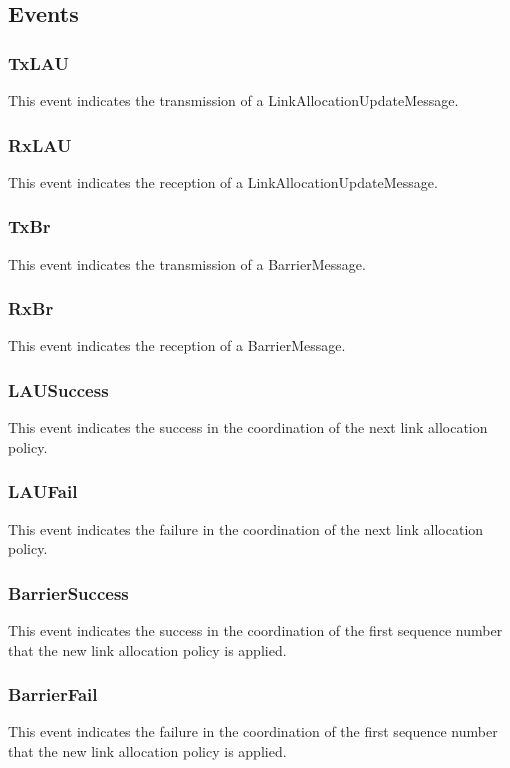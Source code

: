 \subsection{Events}

\subsubsection{TxLAU}
This event indicates the transmission of a LinkAllocationUpdateMessage.

\subsubsection{RxLAU}
This event indicates the reception of a LinkAllocationUpdateMessage.

\subsubsection{TxBr}
This event indicates the transmission of a BarrierMessage.

\subsubsection{RxBr}
This event indicates the reception of a BarrierMessage.

\subsubsection{LAUSuccess}
This event indicates the success in the coordination of the next link allocation policy.

\subsubsection{LAUFail}
This event indicates the failure in the coordination of the next link allocation policy.


\subsubsection{BarrierSuccess}
This event indicates the success in the coordination of the first sequence number that the new link allocation policy is applied.

\subsubsection{BarrierFail}
This event indicates the failure in the coordination of the first sequence number that the new link allocation policy is applied.

